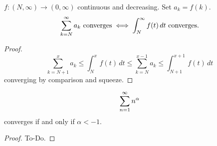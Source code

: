 \begin{theorem}\label{thm:int_test_conv}
    $f : (N, \infty) \to (0, \infty)$ continuous and decreasing.
    Set $a_k = f(k)$.
    \[
    \infsum[k = N]a_k\text{ converges} \iff \int_{N}^{\infty}f(t)\,dt\text{ converges}.
    \]
\end{theorem}
\begin{proof}
    \[
    \sum_{k = N + 1}^{x}a_k \leq \int_{N}^{x}f(t)\,dt \leq \sum_{k = N}^{x - 1}a_k \leq \int_{N + 1}^{x + 1}f(t)\,dt
    \]
    converging by comparison and squeeze.
\end{proof}

\begin{corollary}\label{cor:infsum_conv_inv_iff}
    \[
    \infsum[n = 1]n ^ {\alpha}
    \]
    converges if and only if $\alpha < -1$.
\end{corollary}
\begin{proof}
    To-Do.
\end{proof}






